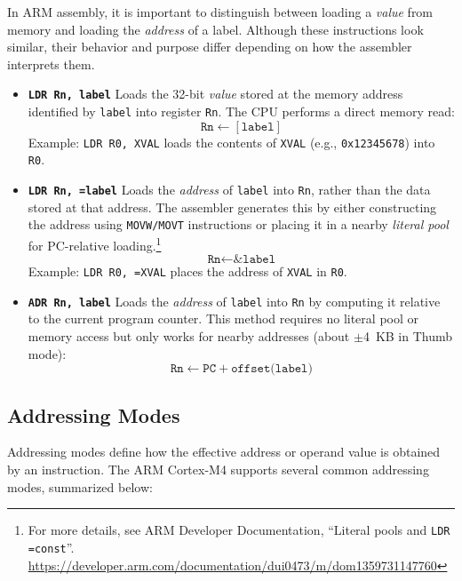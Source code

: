 In ARM assembly, it is important to distinguish between loading a \emph{value} from memory and loading the \emph{address} of a label.  
Although these instructions look similar, their behavior and purpose differ depending on how the assembler interprets them.
\begin{itemize}[nosep]
    \item \textbf{\texttt{LDR Rn, label}}  
    Loads the 32-bit \emph{value} stored at the memory address identified by \texttt{label} into register \texttt{Rn}.  
    The CPU performs a direct memory read:
    \[
      \texttt{Rn} \leftarrow [\texttt{label}]
    \]
    Example: \texttt{LDR R0, XVAL} loads the contents of \texttt{XVAL} (e.g., \texttt{0x12345678}) into \texttt{R0}.
    
    \item \textbf{\texttt{LDR Rn, =label}}  
    Loads the \emph{address} of \texttt{label} into \texttt{Rn}, rather than the data stored at that address.  
    The assembler generates this by either constructing the address using \texttt{MOVW/MOVT} instructions or placing it in a nearby \emph{literal pool} for PC-relative loading.\footnote{For more details, see ARM Developer Documentation, “Literal pools and \texttt{LDR =const}”. \url{https://developer.arm.com/documentation/dui0473/m/dom1359731147760}}  
    \[
      \texttt{Rn} \leftarrow \texttt{\&label}
    \]
    Example: \texttt{LDR R0, =XVAL} places the address of \texttt{XVAL} in \texttt{R0}.
    
    \item \textbf{\texttt{ADR Rn, label}}  
    Loads the \emph{address} of \texttt{label} into \texttt{Rn} by computing it relative to the current program counter.  
    This method requires no literal pool or memory access but only works for nearby addresses (about $\pm$4~KB in Thumb mode):  
    \[
      \texttt{Rn} \leftarrow \texttt{PC} + \texttt{offset(label)}
    \]
\end{itemize}
\subsection{Addressing Modes}

Addressing modes define how the effective address or operand value is obtained by an instruction. 
The ARM Cortex-M4 supports several common addressing modes, summarized below:

